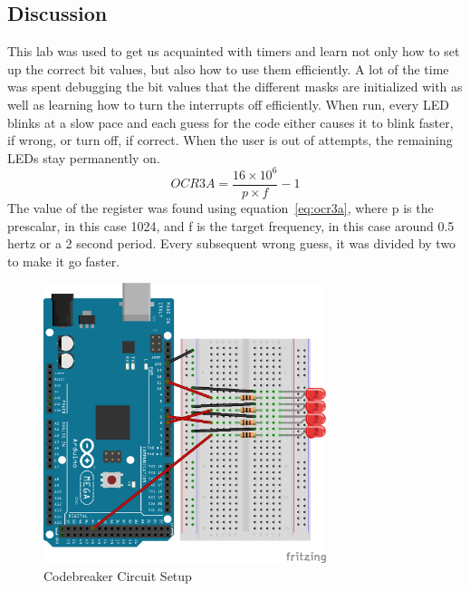 \documentclass[12pt,titlepage]{article}
\begin{document}
\subsection{Discussion}
This lab was used to get us acquainted with timers and learn not only how to set up the correct bit values, but also how to use them efficiently. A lot of the time was spent debugging the bit values that the different masks are initialized with as well as learning how to turn the interrupts off efficiently. When run, every LED blinks at a slow pace and each guess for the code either causes it to blink faster, if wrong, or turn off, if correct. When the user is out of attempts, the remaining LEDs stay permanently on.
\begin{equation} \label{eq:ocr3a}
  OCR3A = \frac{16\times10^6}{p\times f} - 1
\end{equation}
The value of the register was found using equation~\ref{eq:ocr3a}, where p is the prescalar, in this case 1024, and f is the target frequency, in this case around 0.5 hertz or a 2 second period. Every subsequent wrong guess, it was divided by two to make it go faster.
\begin{figure}[!htb]
  \centering
  \includegraphics[width=3.25in]{lab_3_schematic.png}
  \caption{Codebreaker Circuit Setup}\label{fig:lab_3}
\end{figure}
\end{document}
